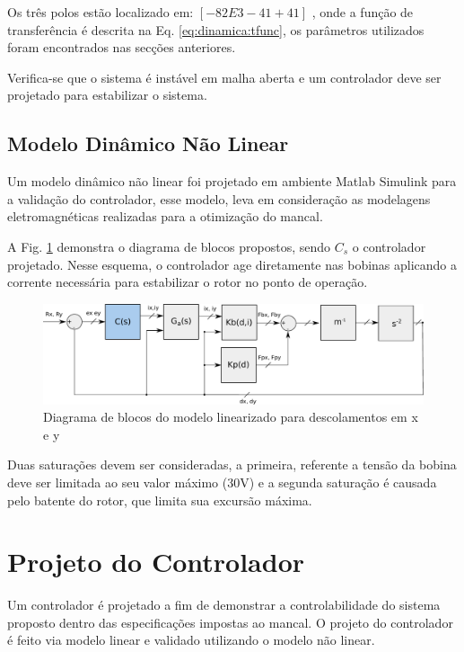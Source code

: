 Os três polos estão localizado em: $[-82E3 -41 +41]	$ , onde a função de transferência é descrita na Eq. \eqref{eq:dinamica:tfunc}, os parâmetros utilizados foram encontrados nas secções anteriores. 

Verifica-se que o sistema é instável em malha aberta e um controlador deve ser projetado para estabilizar o sistema. 

\subsection{Modelo Dinâmico Não Linear}

Um modelo dinâmico não linear foi projetado em ambiente Matlab Simulink para a validação do controlador, esse modelo, leva em consideração as modelagens eletromagnéticas realizadas para a otimização do mancal.

A Fig. \ref{fig:diagrama:blocos:modelo:linear} demonstra o diagrama de blocos propostos, sendo $C_s$ o controlador projetado. Nesse esquema, o controlador age diretamente nas bobinas aplicando a corrente necessária para estabilizar o rotor no ponto de operação. 

\begin{figure}[th!]
	\centering
	\includegraphics[width=1\linewidth]{../Figs/Modelagem/diagrama_blocos_modelo_linear}
	\caption{Diagrama de blocos do modelo linearizado para descolamentos em x e y}
	\label{fig:diagrama:blocos:modelo:linear}
\end{figure}

Duas saturações devem ser consideradas, a primeira, referente a tensão da bobina deve ser limitada ao seu valor máximo (30V) e a segunda saturação é causada pelo batente do rotor, que limita sua excursão máxima.

\section{Projeto do Controlador}

Um controlador é projetado a fim de demonstrar a controlabilidade do sistema proposto dentro das especificações impostas ao mancal. O projeto do controlador é feito via modelo linear e validado utilizando o modelo não linear. 

